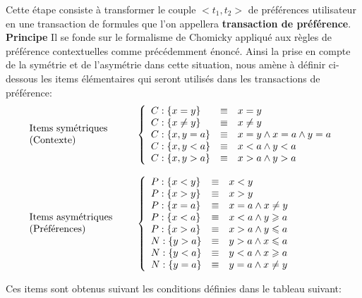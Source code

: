 \documentclass[a4paper,12pt,openany,oneside]{article}
\begin{document}
       Cette étape consiste à transformer le couple $<t_{1},t_{2}>$ de préférences utilisateur en une transaction de formules que l'on appellera \textbf{transaction de préférence}.\\ 
       \textbf{Principe}
       Il se fonde sur le formalisme de Chomicky appliqué aux règles de préférence contextuelles comme précédemment énoncé. Ainsi la prise en compte de la symétrie et de l'asymétrie dans cette situation, nous amène à définir ci-dessous les items élémentaires qui seront utilisés dans les transactions de préférence:\\
 
 
       \[
       \begin{array}{l l}
       \parbox{3.5cm}{Items symétriques\\ (Contexte)}&
 	  \left\{
 		  \begin{array}{l c l}
 		     C:\{x=y\}&\equiv& x=y\\
 		     C:\{x\neq y\}&\equiv& x\neq y\\
 		   	 C:\{x,y=a\}&\equiv& x=y\wedge x=a\wedge y=a\\
 		   	 C:\{x,y<a\}&\equiv& x<a\wedge y<a\\
 		   	 C:\{x,y>a\}&\equiv& x>a\wedge y>a
 	   	 \end{array}
    	 \right.\\
 	&\\
       \parbox{3.5cm}{Items asymétriques\\ (Préférences)}&
 	  \left\{
 		  \begin{array}{l c l}   	 
 		   	 P:\{x<y\}&\equiv& x<y\\
 		   	 P:\{x>y\}&\equiv& x>y\\
 		   	 P:\{x=a\} &\equiv& x=a \wedge x\neq y \\
 		   	 P:\{x<a\} &\equiv& x<a \wedge y\geqslant a\\
 			 P:\{x>a\} &\equiv& x>a \wedge y\leqslant a\\
 			 
 			 N:\{y>a\} &\equiv& y>a \wedge x\leqslant a\\
 			 N:\{y<a\} &\equiv& y<a \wedge x\geqslant a\\
 		   	 N:\{y=a\} &\equiv& y=a \wedge x\neq y\\	 
 	   	 \end{array}
    	 \right.
    	 \end{array}
    	 \]		   	 	 		 
 	 
 	 Ces items sont obtenus suivant les conditions définies dans le tableau suivant:
 	 
\end{document}
